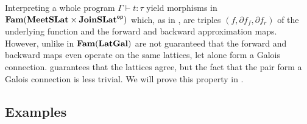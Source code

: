 Interpreting a whole program $\Gamma \vdash t : \tau$ yield morphisms in
$\mathbf{Fam}(\mathbf{MeetSLat} \times \mathbf{JoinSLat}^{\mathsf{op}})$ which, as in , are triples
$(f, \partial f_f, \partial f_r)$ of the underlying function and the forward and backward approximation
maps. However, unlike in $\mathbf{Fam}(\mathbf{LatGal})$ are not guaranteed that the forward and backward maps even operate on
the same lattices, let alone form a Galois connection.  guarantees that
the lattices agree, but the fact that the pair form a Galois connection is less trivial. We will prove this
property in .



\subsection{Examples}

